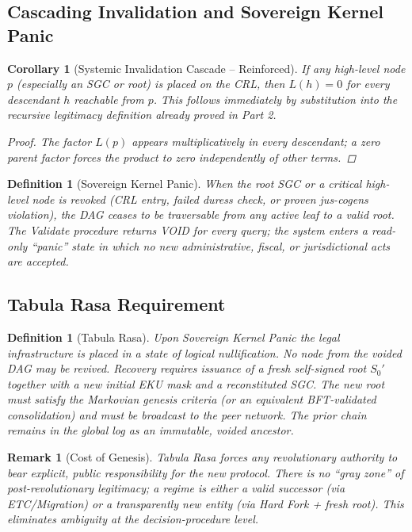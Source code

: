 \documentclass[11pt,a4paper]{article}
\newtheorem{definition}[theorem]{Definition}
\newtheorem{remark}[theorem]{Remark}
\newtheorem{corollary}[theorem]{Corollary}
\begin{document}
\subsection{Cascading Invalidation and Sovereign Kernel Panic}

\begin{corollary}[Systemic Invalidation Cascade -- Reinforced]
If any high-level node \(p\) (especially an SGC or root) is placed on the CRL, then \(L(h) = 0\) for every descendant \(h\) reachable from \(p\). This follows immediately by substitution into the recursive legitimacy definition already proved in Part 2.

\begin{proof}
The factor \(L(p)\) appears multiplicatively in every descendant; a zero parent factor forces the product to zero independently of other terms.
\end{proof}
\end{corollary}

\begin{definition}[Sovereign Kernel Panic]
When the root SGC or a critical high-level node is revoked (CRL entry, failed duress check, or proven jus-cogens violation), the DAG ceases to be traversable from any active leaf to a valid root. The Validate procedure returns VOID for every query; the system enters a read-only ``panic'' state in which no new administrative, fiscal, or jurisdictional acts are accepted.
\end{definition}

\subsection{Tabula Rasa Requirement}

\begin{definition}[Tabula Rasa]
Upon Sovereign Kernel Panic the legal infrastructure is placed in a state of logical nullification. No node from the voided DAG may be revived. Recovery requires issuance of a fresh self-signed root \(S_0'\) together with a new initial EKU mask and a reconstituted SGC. The new root must satisfy the Markovian genesis criteria (or an equivalent BFT-validated consolidation) and must be broadcast to the peer network. The prior chain remains in the global log as an immutable, voided ancestor.
\end{definition}

\begin{remark}[Cost of Genesis]
Tabula Rasa forces any revolutionary authority to bear explicit, public responsibility for the new protocol. There is no ``gray zone'' of post-revolutionary legitimacy; a regime is either a valid successor (via ETC/Migration) or a transparently new entity (via Hard Fork + fresh root). This eliminates ambiguity at the decision-procedure level.
\end{remark}
\end{document}
